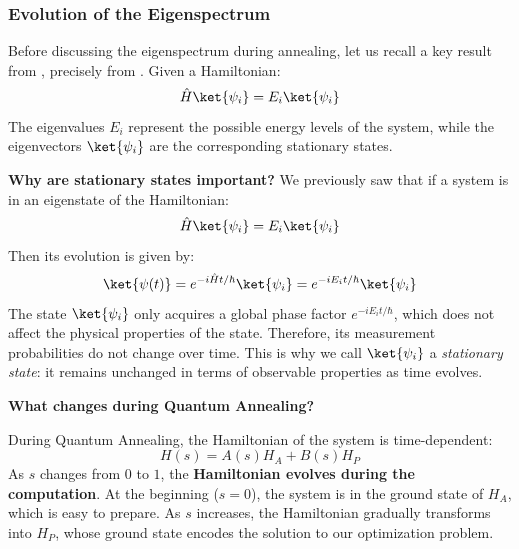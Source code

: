 \subsubsection{Evolution of the Eigenspectrum}\label{sec:evolution-of-eigenspectrum}

Before discussing the eigenspectrum during annealing, let us recall a key result from , precisely from . Given a Hamiltonian:
\begin{equation*}
    \hat{H}\ket{\psi_i} = E_i \ket{\psi_i}
\end{equation*}
The eigenvalues $E_i$ represent the possible energy levels of the system, while the eigenvectors $\ket{\psi_i}$ are the corresponding stationary states.

\highspace
\textcolor{Green3}{ \textbf{Why are stationary states important?}} We previously saw that if a system is in an eigenstate of the Hamiltonian:
\begin{equation*}
    \hat{H}\ket{\psi_i} = E_i \ket{\psi_i}
\end{equation*}
Then its evolution is given by:
\begin{equation*}
    \ket{\psi(t)} = e^{-i\hat{H}t/\hbar}\ket{\psi_i} = e^{-iE_{i}t/\hbar}\ket{\psi_i}
\end{equation*}
The state $\ket{\psi_i}$ only acquires a global phase factor $e^{-iE_{i}t/\hbar}$, which does not affect the physical properties of the state. Therefore, its measurement probabilities do not change over time. This is why we call $\ket{\psi_i}$ a \textit{stationary state}: it remains unchanged in terms of observable properties as time evolves.

\highspace
\begin{flushleft}
    \textcolor{Green3}{ \textbf{What changes during Quantum Annealing?}}
\end{flushleft}
During Quantum Annealing, the Hamiltonian of the system is time-dependent:
\begin{equation*}
    H(s) = A(s)H_{A} + B(s)H_{P}
\end{equation*}
As $s$ changes from $0$ to $1$, the \textbf{Hamiltonian evolves during the computation}. At the beginning ($s=0$), the system is in the ground state of $H_{A}$, which is easy to prepare. As $s$ increases, the Hamiltonian gradually transforms into $H_{P}$, whose ground state encodes the solution to our optimization problem. 

